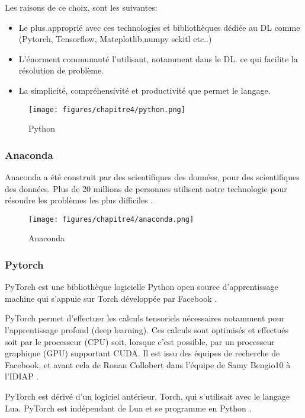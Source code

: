         
        Les raisons de ce choix, sont les suivantes:
    	\begin{itemize}[label=•]
    	\setlength{\itemsep}{5pt}
            \item Le plus approprié avec ces technologies et bibliothèques dédiée au DL comme (Pytorch, Tensorflow, Mateplotlib,numpy sckitl etc..)
            \item L'énorment communauté l'utilisant, notamment dans le DL. ce qui facilite la résolution de problème.
            \item La simplicité, compréhensivité et productivité que permet le langage. 
        \end{itemize}
        
        \begin{figure}[H]
        	\begin{center}
        		\texttt{[image: figures/chapitre4/python.png]}
        	\end{center}
        	\caption {Python}
        	\label{fig:py}
        \end{figure} 
        
        \subsubsection{Anaconda}
        \par Anaconda a été construit par des scientifiques des données, pour des scientifiques des données. Plus de 20 millions de personnes utilisent notre technologie pour résoudre les problèmes les plus difficiles \cite{anaconda}.
        
        \begin{figure}[H]
        	\begin{center}
        		\texttt{[image: figures/chapitre4/anaconda.png]}
        	\end{center}
        	\caption {Anaconda}
        	\label{fig:anaconda}
        \end{figure} 
        
        \subsubsection{Pytorch }
        \par PyTorch est une bibliothèque logicielle Python open source d'apprentissage machine qui s'appuie sur Torch développée par Facebook \cite{pytorch}.
        \par PyTorch permet d'effectuer les calculs tensoriels nécessaires notamment pour l'apprentissage profond (deep learning). Ces calculs sont optimisés et effectués soit par le processeur (CPU) soit, lorsque c'est possible, par un processeur graphique (GPU) supportant CUDA. Il est issu des équipes de recherche de Facebook, et avant cela de Ronan Collobert dans l'équipe de Samy Bengio10 à l'IDIAP \cite{pytorch}.
        \par PyTorch est dérivé d'un logiciel antérieur, Torch, qui s'utilisait avec le langage Lua. PyTorch est indépendant de Lua et se programme en Python \cite{pytorch}.
         
